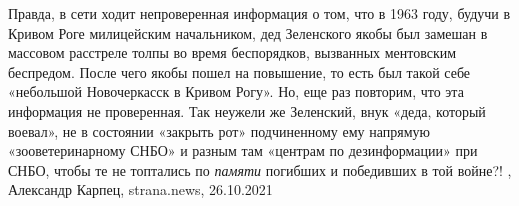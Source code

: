 Правда, в сети ходит непроверенная информация о том, что в 1963 году, будучи в
Кривом Роге милицейским начальником, дед Зеленского якобы был замешан в
массовом расстреле толпы во время беспорядков, вызванных ментовским беспредом.
После чего якобы пошел на повышение, то есть был такой себе «небольшой
Новочеркасск в Кривом Рогу». Но, еще раз повторим, что эта информация не
проверенная.  Так неужели же Зеленский, внук «деда, который воевал», не в
состоянии «закрыть рот» подчиненному ему напрямую «зооветеринарному СНБО» и
разным там «центрам по дезинформации» при СНБО, чтобы те не топтались по \emph{памяти}
погибших и победивших в той войне?!
, 
Александр Карпец, strana.news, 26.10.2021
